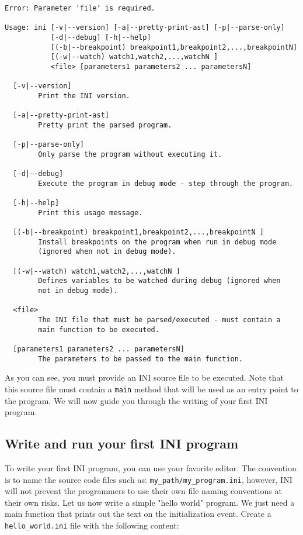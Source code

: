 \documentclass[11pt]{article}
\begin{document}
{\scriptsize \begin{lstlisting}[numbers=none]
Error: Parameter 'file' is required.

Usage: ini [-v|--version] [-a|--pretty-print-ast] [-p|--parse-only]
           [-d|--debug] [-h|--help]
           [(-b|--breakpoint) breakpoint1,breakpoint2,...,breakpointN]
           [(-w|--watch) watch1,watch2,...,watchN ]
           <file> [parameters1 parameters2 ... parametersN]

  [-v|--version]
        Print the INI version.

  [-a|--pretty-print-ast]
        Pretty print the parsed program.

  [-p|--parse-only]
        Only parse the program without executing it.

  [-d|--debug]
        Execute the program in debug mode - step through the program.

  [-h|--help]
        Print this usage message.

  [(-b|--breakpoint) breakpoint1,breakpoint2,...,breakpointN ]
        Install breakpoints on the program when run in debug mode
        (ignored when not in debug mode).

  [(-w|--watch) watch1,watch2,...,watchN ]
        Defines variables to be watched during debug (ignored when
        not in debug mode).

  <file>
        The INI file that must be parsed/executed - must contain a
        main function to be executed.

  [parameters1 parameters2 ... parametersN]
        The parameters to be passed to the main function.
\end{lstlisting} }

As you can see, you must provide an INI source file to be executed. Note that this source file must contain a \texttt{main} method that will be used as an entry point to the program. We will now guide you through the writing of your first INI program.

\subsection{Write and run your first INI program}

To write your first INI program, you can use your favorite editor. The convention is to name the source code files such as: \texttt{my\_path/my\_program.ini}, however, INI will not prevent the programmers to use their own file naming conventions at their own risks. Let us now write a simple "hello world" program. We just need a main function that prints out the text on the initialization event. Create a \texttt{hello\_world.ini} file with the following content:
\end{document}
